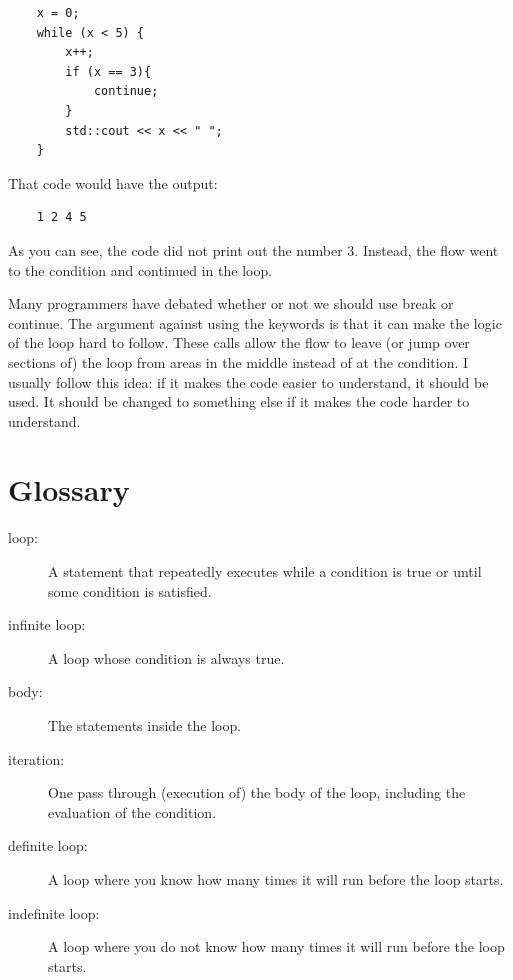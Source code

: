 \begin{lstlisting}
    x = 0;
    while (x < 5) {
        x++;
        if (x == 3){
            continue;
        }
        std::cout << x << " ";
    }
\end{lstlisting}
That code would have the output:
\begin{verbatim}
    1 2 4 5 
\end{verbatim}
As you can see, the code did not print out
the number 3. Instead, the flow went to the 
condition and continued in the loop.

Many programmers have debated whether or not we should use break or continue. The argument against using the keywords is that it can make the logic of the loop hard to follow. These calls allow the flow to leave (or jump over sections of) the loop from areas in the middle instead of at the condition. 
I usually follow this idea: if it makes the code easier to understand, it should be used. It should be changed to something else if it makes the code harder to understand.

\section{Glossary}

\begin{description}

\item[loop:]  A statement that repeatedly executes while a
condition is true or until some condition is satisfied.

\item[infinite loop:]  A loop whose condition is always true.

\item[body:]  The statements inside the loop.

\item[iteration:]  One pass through (execution of) the body
of the loop, including the evaluation of the condition.

\item[definite loop:]  A loop where you know how many times
it will run before the loop starts.

\item[indefinite loop:]  A loop where you do not know how many
times it will run before the loop starts.




\end{description}

